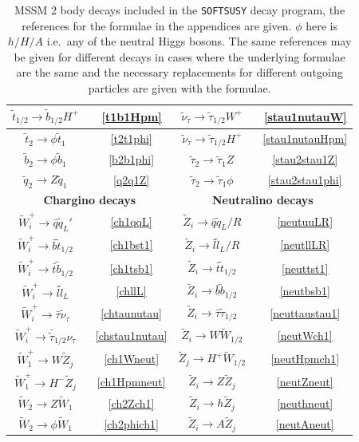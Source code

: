 \documentclass[final,3p,times,pdflatex]{elsarticle}
\begin{document}
\begin{center}
\begin{table}
\begin{tabular}{|c|c|c|c|}
$\tilde{t}_{1/2} \rightarrow \tilde{b}_{1/2} H^+$ &~\ref{t1b1Hpm} & $\tilde{\nu}_{\tau} \rightarrow \tilde{\tau}_{1/2} W^+$ &~\ref{stau1nutauW} \\ \hline
$\tilde{t}_2 \rightarrow \phi \tilde{t}_1$ &~\ref{t2t1phi} & $\tilde{\nu}_{\tau} \rightarrow \tilde{\tau}_{1/2} H^+$ &~\ref{stau1nutauHpm} \\ \hline
$\tilde{b}_2 \rightarrow \phi \tilde{b}_1$ &~\ref{b2b1phi} & $\tilde{\tau}_2 \rightarrow \tilde{\tau}_1 Z$ &~\ref{stau2stau1Z} \\ \hline
$\tilde{q}_2 \rightarrow Z \tilde{q}_1$ &~\ref{q2q1Z} & $\tilde{\tau}_2 \rightarrow \tilde{\tau}_1 \phi$ &~\ref{stau2stau1phi} \\ \hline
\multicolumn{2}{|c|}{\bf{Chargino decays}} & \multicolumn{2}{c|}{\bf{Neutralino decays}} \\ \hline
$\tilde{W}_{i}^+ \rightarrow \bar{q} \tilde{q}_L'$ &~\ref{ch1qqL} & $\tilde{Z}_i \rightarrow \bar{q} \tilde{q}_L/R$ &~\ref{neutuuLR} \\ \hline
$\tilde{W}_{i}^+ \rightarrow \bar{b} \tilde{t}_{1/2}$ &~\ref{ch1bst1} & $\tilde{Z}_i \rightarrow \bar{l} \tilde{l}_L/R$ &~\ref{neutllLR} \\ \hline
$\tilde{W}_{i}^+ \rightarrow \bar{t} \tilde{b}_{1/2}$ &~\ref{ch1tsb1} & $\tilde{Z}_i \rightarrow \bar{t} \tilde{t}_{1/2}$ &~\ref{neuttst1} \\ \hline
$\tilde{W}_i^+ \rightarrow \bar{l} \tilde{l}_{L}$ &~\ref{chllL} & $\tilde{Z}_i \rightarrow \bar{b} \tilde{b}_{1/2}$ &~\ref{neutbsb1} \\ \hline
$\tilde{W}_i^+ \rightarrow \bar{\tau} \tilde{\nu}_{\tau}$ &~\ref{chtaunutau} & $\tilde{Z}_i \rightarrow \bar{\tau} \tilde{\tau}_{1/2}$ &~\ref{neuttaustau1} \\ \hline
$\tilde{W}_i^+ \rightarrow \bar{\tilde{\tau}}_{1/2} \nu_{\tau}$ &~\ref{chstau1nutau} & $\tilde{Z}_i \rightarrow W \tilde{W}_{1/2}$ &~\ref{neutWch1} \\ \hline
$\tilde{W}_1^+ \rightarrow W \tilde{Z}_j$ &~\ref{ch1Wneut} & $\tilde{Z}_j \rightarrow H^+ \tilde{W}_{1/2}$ &~\ref{neutHpmch1} \\ \hline
$\tilde{W}_1^+ \rightarrow H^- \tilde{Z}_j$ &~\ref{ch1Hpmneut} & $\tilde{Z}_i \rightarrow Z \tilde{Z}_{j}$ &~\ref{neutZneut} \\ \hline
$\tilde{W}_2 \rightarrow Z \tilde{W}_1$ &~\ref{ch2Zch1} & $\tilde{Z}_i \rightarrow h \tilde{Z}_{j}$ &~\ref{neuthneut} \\ \hline
$\tilde{W}_2 \rightarrow \phi \tilde{W}_1$ &~\ref{ch2phich1} & $\tilde{Z}_i \rightarrow A \tilde{Z}_{j}$ &~\ref{neutAneut} \\ \hline
\end{tabular}
\caption{MSSM 2 body decays included in the {\tt SOFTSUSY} decay program,
  the references for the formulae in the appendices are given. $\phi$ here is
  $h/H/A$ i.e.\ any of the neutral Higgs bosons. The same references may be
  given for different decays in cases where the underlying formulae are the
  same and the necessary replacements for different outgoing particles are
  given with the formulae.} 
\label{MSSMdecaysreftable}
\end{table}
\end{center}
\end{document}

